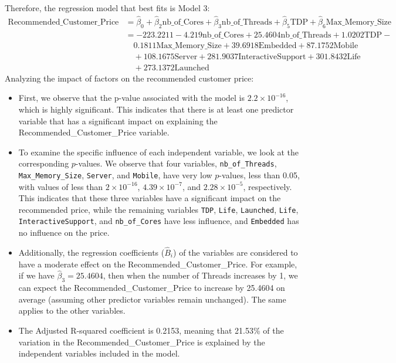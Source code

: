 \documentclass[a4paper]{article}
\begin{document}
	Therefore, the regression model that best fits is Model 3:
	\begin{align*}
	\text{Recommended\_Customer\_Price} &= \hat{\beta}_0 + \hat{\beta}_2 \text{nb\_of\_Cores} + \hat{\beta}_3 \text{nb\_of\_Threads} + \hat{\beta}_5 \text{TDP} + \hat{\beta}_6 \text{Max\_Memory\_Size} \\
	&= -223.2211 - 4.219 \text{nb\_of\_Cores} + 25.4604 \text{nb\_of\_Threads} + 1.0202 \text{TDP} -
	 \\
	&\quad  0.1811 \text{Max\_Memory\_Size} + 39.6918 \text{Embedded} + 87.1752 \text{Mobile} \\
	&\quad + 108.1675 \text{Server} + 281.9037 \text{InteractiveSupport} + 301.8432 \text{Life} \\
	&\quad+ 273.1372 \text{Launched}
	\end{align*}
	Analyzing the impact of factors on the recommended customer price:
	\begin{itemize}
		\item First, we observe that the p-value associated with the model is $2.2 \times 10^{-16}$, which is highly significant. This indicates that there is at least one predictor variable that has a significant impact on explaining the Recommended\_Customer\_Price variable.
		\item To examine the specific influence of each independent variable, we look at the corresponding $p$-values. We observe that four variables, \texttt{nb\_of\_Threads}, \texttt{Max\_Memory\_Size}, \texttt{Server}, and \texttt{Mobile}, have very low $p$-values, less than 0.05, with values of less than $2 \times 10^{-16}$, $4.39 \times 10^{-7}$, and $2.28 \times 10^{-5}$, respectively. This indicates that these three variables have a significant impact on the recommended price, while the remaining variables \texttt{TDP}, \texttt{Life}, \texttt{Launched}, \texttt{Life}, \texttt{InteractiveSupport}, and \texttt{nb\_of\_Cores} have less influence, and \texttt{Embedded} has no influence on the price.
		\item Additionally, the regression coefficients ($\hat{B}_i$) of the variables are considered to have a moderate effect on the Recommended\_Customer\_Price. For example, if we have $\hat{\beta}_3 = 25.4604$, then when the number of Threads increases by 1, we can expect the Recommended\_Customer\_Price to increase by 25.4604 on average (assuming other predictor variables remain unchanged). The same applies to the other variables.
		\item The Adjusted R-squared coefficient is 0.2153, meaning that 21.53\% of the variation in the Recommended\_Customer\_Price is explained by the independent variables included in the model.
	\end{itemize}
	
\end{document}
